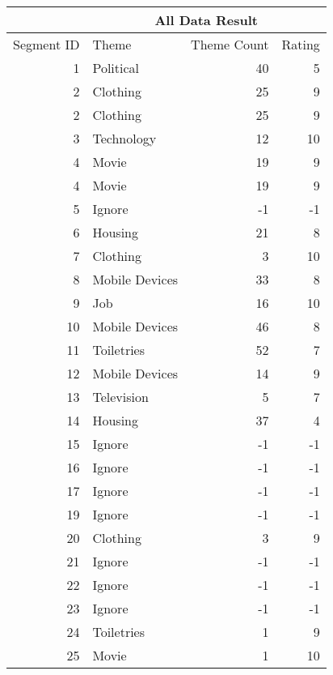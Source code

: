 
    \begin{tabular}{|r|l|r|r|}
    	\hline
          & \multicolumn{3}{|c|}{All Data Result} \\
          \hline
    \multicolumn{1}{|l|}{Segment ID} & Theme & \multicolumn{1}{|l|}{Theme Count} & \multicolumn{1}{|l|}{Rating} \\
    \hline
    1     & Political & 40    & 5 \\
    2     & Clothing & 25    & 9 \\
    2     & Clothing & 25    & 9 \\
    3     & Technology & 12    & 10 \\
    4     & Movie & 19    & 9 \\
    4     & Movie & 19    & 9 \\
    5     & Ignore & -1    & -1 \\
    6     & Housing & 21    & 8 \\
    7     & Clothing & 3     & 10 \\
    8     & Mobile Devices & 33    & 8 \\
    9     & Job   & 16    & 10 \\
    10    & Mobile Devices & 46    & 8 \\
    11    & Toiletries & 52    & 7 \\
    12    & Mobile Devices & 14    & 9 \\
    13    & Television & 5     & 7 \\
    14    & Housing & 37    & 4 \\
    15    & Ignore & -1    & -1 \\
    16    & Ignore & -1    & -1 \\
    17    & Ignore & -1    & -1 \\
    19    & Ignore & -1    & -1 \\
    20    & Clothing & 3     & 9 \\
    21    & Ignore & -1    & -1 \\
    22    & Ignore & -1    & -1 \\
    23    & Ignore & -1    & -1 \\
    24    & Toiletries & 1     & 9 \\
    25    & Movie & 1     & 10 \\
    \hline
    \end{tabular}%

